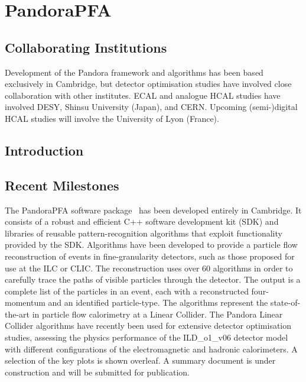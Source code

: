 \section{PandoraPFA}

\subsection{Collaborating Institutions}

Development of the Pandora framework and algorithms has been based exclusively
in Cambridge, but detector optimisation studies have involved close
collaboration with other institutes. ECAL and analogue HCAL studies have
involved DESY, Shinsu University (Japan), and CERN. Upcoming (semi-)digital HCAL
studies will involve the University of Lyon (France).

\subsection{Introduction}
\subsection{Recent Milestones}
The PandoraPFA software package~\cite{Thomson200925,Marshall2013153}
has been developed entirely in Cambridge.
It consists of a robust and efficient C++ software development kit (SDK) and
libraries of reusable pattern-recognition algorithms that exploit functionality
provided by the SDK. Algorithms have been developed to provide a particle flow
reconstruction of events in fine-granularity detectors, such as those proposed
for use at the ILC or CLIC. The reconstruction uses over 60 algorithms in order
to carefully trace the paths of visible particles through the detector. The
output is a complete list of the particles in an event, each with a
reconstructed four-momentum and an identified particle-type. The algorithms
represent the state-of-the-art in particle flow calorimetry at a Linear
Collider. The Pandora Linear Collider algorithms have recently been used for
extensive detector optimisation studies, assessing the physics performance of
the ILD\_o1\_v06 detector model with different configurations of the
electromagnetic and hadronic calorimeters. A selection of the key plots is shown
overleaf. A summary document is under construction and will be submitted for
publication.

